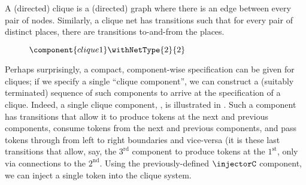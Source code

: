 \newcommand{\cliqueC}{\component{clique1}}

A (directed) clique is a (directed) graph where there is an edge between every
pair of nodes. Similarly, a clique net has transitions such that for every pair
of distinct places, there are transitions to-and-from the places.

\begin{figure}[ht]
\centering
{}
\caption{$\cliqueC \withNetType{2}{2}$}
\label{fig:cliqueC}
\end{figure}

Perhaps surprisingly, a compact, component-wise specification can be given for
cliques; if we specify a single ``clique component'', we can construct a
(suitably terminated) sequence of such components to arrive at the
specification of a clique. Indeed, a single clique component, \cliqueC{}, is
illustrated in . Such a component has transitions that
allow it to produce tokens at the next and previous components, consume tokens
from the next and previous components, and pass tokens through from left to
right boundaries and vice-versa (it is these last transitions that allow, say,
the $3^{\text{rd}}$ component to produce tokens at the $1^\text{st}$, only via
connections to the $2^\text{nd}$. Using the previously-defined $\injectorC$
component, we can inject a single token into the clique system.

\begin{figure}[ht]
\centering
{}
\caption{}
\label{fig:clique3}
\end{figure}

